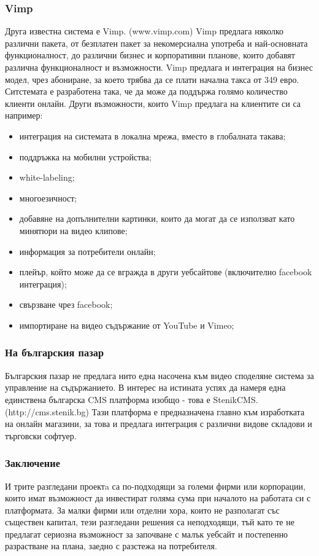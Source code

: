 \documentclass[pdftex,12pt,a4paper]{report}
\begin{document}
\subsubsection[Vimp]{Vimp}
Друга известна система е Vimp. (www.vimp.com) Vimp предлага няколко различни пакета, от безплатен пакет за некомерсиална употреба и най-основната функционалност, до различни бизнес и корпоративни планове, които добавят различна функционалност и възможности. Vimp предлага и интеграция на бизнес модел, чрез абониране, за което трябва да се плати начална такса от 349 евро. Ситстемата е разработена така, че да може да поддържа голямо количество клиенти онлайн. Други възможности, които Vimp предлага на клиентите си са например:
\begin{itemize}
	\item интеграция на системата в локална мрежа, вместо в глобалната такава;
	\item поддръжка на мобилни устройства;
	\item white-labeling;
	\item многоезичност;
	\item добавяне на допълнителни картинки, които да могат да се използват като минятюри на видео клипове;
	\item информация за потребители онлайн;
	\item плейър, който може да се вгражда в други уебсайтове (включително facebook интеграция);
	\item свързване чрез facebook;
	\item импортиране на видео съдържание от YouTube и Vimeo;
\end{itemize}
\subsubsection[На българския пазар] {На българския пазар}
Българския пазар не предлага нито една насочена към видео споделяне система  за управление на съдържанието. В интерес на истината успях да намеря една единствена българска CMS платформа изобщо - това е StenikCMS. (http://cms.stenik.bg) Тази платформа е предназначена главно към изработката на онлайн магазини, за това и предлага интеграция с различни видове складови и търговски софтуер.
\subsubsection[Заключение] {Заключение}
И трите разгледани проектa са по-подходящи за големи фирми или корпорации, които имат възможност да инвестират голяма сума при началото на работата си с платформата. За малки фирми или отделни хора, които не разполагат със съществен капитал, тези разгледани решения са неподходящи, тъй като те не предлагат сериозна възможност за започване с малък уебсайт и постепенно разрастване на плана, заедно с разстежа на потребителя.
\end{document}
